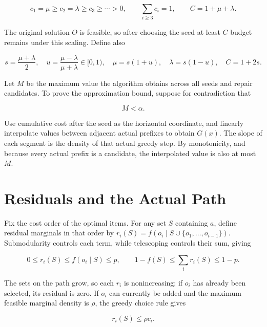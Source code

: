 \documentclass[11pt,a4paper]{article}
\begin{document}
\begin{equation}
c_1=\mu\ge c_2=\lambda\ge c_3\ge\cdots>0,\qquad
\sum_{i\ge3}c_i=1,\qquad C=1+\mu+\lambda.
\tag{1.2}
\end{equation}

The original solution $O$ is feasible, so after choosing the seed at least $C$ budget remains under this scaling. Define also

\begin{equation}
s=\frac{\mu+\lambda}{2},\quad
u=\frac{\mu-\lambda}{\mu+\lambda}\in[0,1),\quad
\mu=s(1+u),\quad\lambda=s(1-u),\quad C=1+2s.
\tag{1.3}
\end{equation}

Let $M$ be the maximum value the algorithm obtains across all seeds and repair candidates. To prove the approximation bound, suppose for contradiction that

\begin{equation}
M<\alpha.
\tag{1.4}
\end{equation}

Use cumulative cost after the seed as the horizontal coordinate, and linearly interpolate values between adjacent actual prefixes to obtain $G(x)$. The slope of each segment is the density of that actual greedy step. By monotonicity, and because every actual prefix is a candidate, the interpolated value is also at most $M$.

\section{Residuals and the Actual Path}

Fix the cost order of the optimal items. For any set $S$ containing $a$, define residual marginals in that order by
$r_i(S)=f(o_i\mid S\cup\{o_1,\ldots,o_{i-1}\})$.
Submodularity controls each term, while telescoping controls their sum, giving

\begin{equation}
0\le r_i(S)\le f(o_i\mid S)\le p,\qquad
1-f(S)\le\sum_i r_i(S)\le1-p.
\tag{2.1}
\end{equation}

The sets on the path grow, so each $r_i$ is nonincreasing; if $o_i$ has already been selected, its residual is zero. If $o_i$ can currently be added and the maximum feasible marginal density is $\rho$, the greedy choice rule gives

\begin{equation}
r_i(S)\le\rho c_i.
\tag{2.2}
\end{equation}
\end{document}
